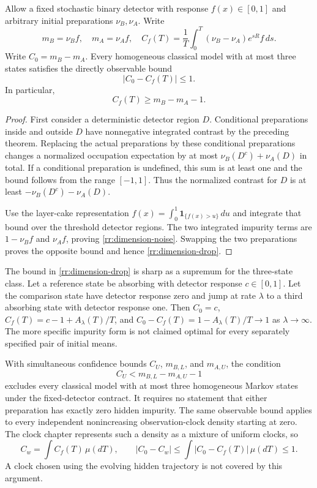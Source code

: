 \begin{proposition}
\label{rr:dimension-robust}
Allow a fixed stochastic binary detector with response $f(x)\in[0,1]$ and
arbitrary initial preparations $\nu_B,\nu_A$. Write
\[
 m_B=\nu_B f,\quad m_A=\nu_A f,\quad
 C_f(T)=\frac1T\int_0^T(\nu_B-\nu_A)e^{sR}f\,ds.
\]
Write $C_0=m_B-m_A$. Every homogeneous classical model with at most three
states satisfies the directly observable bound
\begin{equation}
 \boxed{\left|C_0-C_f(T)\right|\leq1.}
 \label{rr:dimension-drop}
\end{equation}
In particular,
\begin{equation}
 C_f(T)\geq m_B-m_A-1.
 \label{rr:dimension-noise}
\end{equation}
\end{proposition}
\begin{proof}
First consider a deterministic detector region $D$. Conditional preparations
inside and outside $D$ have nonnegative integrated contrast by the preceding
theorem. Replacing the actual preparations by these conditional preparations
changes a normalized occupation expectation by at most
$\nu_B(D^c)+\nu_A(D)$ in total. If a conditional preparation is undefined, this
sum is at least one and the bound follows from the range $[-1,1]$.
Thus the normalized contrast for $D$ is at least
$-\nu_B(D^c)-\nu_A(D)$.

Use the layer-cake representation
$f(x)=\int_0^1\mathbf1_{\{f(x)>u\}}\,du$ and integrate that bound over the
threshold detector regions. The two integrated impurity terms are
$1-\nu_B f$ and $\nu_A f$, proving \eqref{rr:dimension-noise}. Swapping the
two preparations proves the opposite bound and hence
\eqref{rr:dimension-drop}.
\end{proof}

The bound in \eqref{rr:dimension-drop} is sharp as a supremum for the
three-state class. Let a reference state be absorbing with detector response
$c\in[0,1]$. Let the comparison state have detector response zero and jump at
rate $\lambda$ to a third absorbing state with detector response one. Then
$C_0=c$, $C_f(T)=c-1+A_\lambda(T)/T$, and
$C_0-C_f(T)=1-A_\lambda(T)/T\to1$ as $\lambda\to\infty$.
The more specific impurity form is not claimed optimal for every separately
specified pair of initial means.

With simultaneous confidence
bounds $C_U$, $m_{B,L}$, and $m_{A,U}$, the condition
\[
 C_U<m_{B,L}-m_{A,U}-1
\]
excludes every classical model with at most three homogeneous Markov states
under the fixed-detector contract. It requires no statement that either
preparation has exactly zero hidden impurity. The same observable bound applies to every independent nonincreasing
observation-clock density starting at zero. The clock chapter represents such
a density as a mixture of uniform clocks, so
\[
 C_w=\int C_f(T)\,\mu(dT),\qquad
 |C_0-C_w|\leq\int|C_0-C_f(T)|\,\mu(dT)\leq1.
\]
A clock chosen using the evolving hidden trajectory is not covered by this
argument.


